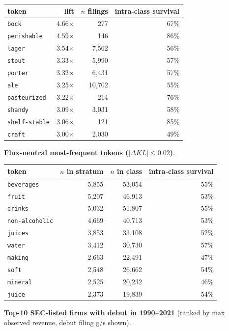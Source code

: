 \begin{tabular}{lrrr}
\toprule
token & lift & $n$ filings & intra-class survival \\
\midrule
\texttt{bock} & 4.66$\times$ & 277 & 67\% \\
\texttt{perishable} & 4.59$\times$ & 146 & 86\% \\
\texttt{lager} & 3.54$\times$ & 7,562 & 56\% \\
\texttt{stout} & 3.33$\times$ & 5,990 & 57\% \\
\texttt{porter} & 3.32$\times$ & 6,431 & 57\% \\
\texttt{ale} & 3.25$\times$ & 10,702 & 55\% \\
\texttt{pasteurized} & 3.22$\times$ & 214 & 76\% \\
\texttt{shandy} & 3.09$\times$ & 3,031 & 58\% \\
\texttt{shelf-stable} & 3.06$\times$ & 121 & 85\% \\
\texttt{craft} & 3.00$\times$ & 2,030 & 49\% \\
\bottomrule
\end{tabular}

\textbf{Flux-neutral most-frequent tokens ($|\Delta KL|\leq 0.02$)}.

\begin{tabular}{lrrr}
\toprule
token & $n$ in stratum & $n$ in class & intra-class survival \\
\midrule
\texttt{beverages} & 5,855 & 53,054 & 55\% \\
\texttt{fruit} & 5,207 & 46,913 & 53\% \\
\texttt{drinks} & 5,032 & 51,807 & 55\% \\
\texttt{non-alcoholic} & 4,669 & 40,713 & 53\% \\
\texttt{juices} & 3,853 & 33,108 & 52\% \\
\texttt{water} & 3,412 & 30,730 & 57\% \\
\texttt{making} & 2,663 & 22,491 & 47\% \\
\texttt{soft} & 2,548 & 26,662 & 54\% \\
\texttt{mineral} & 2,525 & 20,232 & 46\% \\
\texttt{juice} & 2,373 & 19,839 & 54\% \\
\bottomrule
\end{tabular}

\textbf{Top-10 SEC-listed firms with debut in 1990--2021} (ranked by max observed revenue, debut filing g/s shown).

